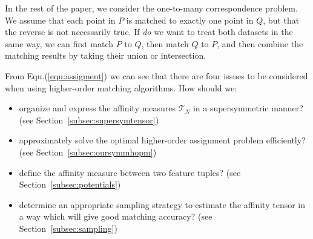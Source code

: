 In the rest of the paper, we consider the one-to-many correspondence problem.
We assume that each point in $P$ is matched to exactly one point in $Q$, but that the reverse is not necessarily true.
If \emph{do} we want to treat both datasets in the same way,
we can first match $P$ to $Q$, then match $Q$ to $P$, and then combine the matching results by taking their union or intersection.

From Equ.(\ref{equ:assigment}) we can see that there are four issues to be considered when using higher-order matching algorithms. How should we:
\begin{itemize}
\item organize and express the affinity measures $\mathcal{T}_N$ in a supersymmetric manner? (see Section~\ref{subsec:supersymtensor})
\item approximately solve the optimal higher-order assignment problem efficiently? (see Section~\ref{subsec:oursymmhopm})
\item define the affinity measure between two feature tuples? (see Section~\ref{subsec:potentials})
\item determine an appropriate sampling strategy to estimate the affinity tensor in a way which will give good matching accuracy? (see Section~\ref{subsec:sampling})
\end{itemize}



